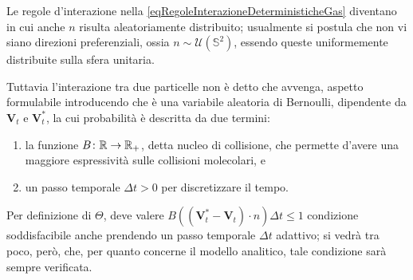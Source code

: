         Le regole d'interazione nella \eqref{eqRegoleInterazioneDeterministicheGas} diventano
        in cui anche \(n\) risulta aleatoriamente distribuito; usualmente si postula che non vi siano direzioni preferenziali, ossia \(n\sim\mathcal U(\mathbb S^2)\), essendo queste uniformemente distribuite sulla sfera unitaria.

        Tuttavia l'interazione tra due particelle non è detto che avvenga, aspetto formulabile introducendo 
        che è una variabile aleatoria di Bernoulli, dipendente da \(\mathbf V_t\) e \(\mathbf V^*_t\), la cui probabilità è descritta da due termini:
        
        \begin{enumerate}[
          label=\arabic*.,
        ]
          \item la funzione \(B\colon\mathbb R\to\mathbb R_+\), detta nucleo di collisione, che permette d'avere una maggiore espressività sulle collisioni molecolari\footnotemark{}, e%
          \item un passo temporale \(\Delta t>0\) per discretizzare il tempo.
        \end{enumerate}
        
        \begin{oss}
          \label{ossCondizioneTetaGas}
          Per definizione di \(\Theta\), deve valere \(B((\mathbf V^*_t-\mathbf V_t)\cdot n)\Delta t\le1\) condizione soddisfacibile anche prendendo un passo temporale \(\Delta t\) adattivo; si vedrà tra poco, però, che, per quanto concerne il modello analitico, tale condizione sarà sempre verificata.
        \end{oss}

